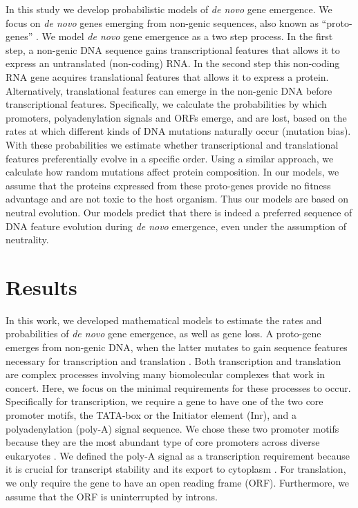 \documentclass[12pt,a4paper]{article}
\begin{document}
In this study we develop probabilistic models of \textit{de novo} gene emergence. We focus on \textit{de novo} genes emerging from non-genic sequences, also known as ``proto-genes'' \citep{protogenes,vanOss}. We model \textit{de novo} gene emergence as a two step process. In the first step, a non-genic DNA sequence gains transcriptional features that allows it to express an untranslated (non-coding) RNA. In the second step this non-coding RNA gene acquires translational features that allows it to express a protein. Alternatively, translational features can emerge in the non-genic DNA before transcriptional features. Specifically, we calculate the probabilities by which promoters, polyadenylation signals and ORFs emerge, and are lost, based on the rates at which different kinds of DNA mutations naturally occur (mutation bias). With these probabilities we estimate whether transcriptional and translational features preferentially evolve in a specific order. Using a similar approach, we calculate how random mutations affect protein composition. In our models, we assume that the proteins expressed from these proto-genes provide no fitness advantage and are not toxic to the host organism. Thus our models are based on neutral evolution. Our models predict that there is indeed a preferred sequence of DNA feature evolution during \textit{de novo} emergence, even under the assumption of neutrality.

\section{Results}

In this work, we developed mathematical models to estimate the rates and probabilities of \textit{de novo} gene emergence, as well as gene loss. A proto-gene emerges from non-genic DNA, when the latter mutates to gain sequence features necessary for transcription and translation \citep{protogenes,vanOss}. Both transcription and translation are complex processes involving many biomolecular complexes that work in concert. Here, we focus on the minimal requirements for these processes to occur. Specifically for transcription, we require a gene to have one of the two core promoter motifs, the TATA-box or the Initiator element (Inr), and a polyadenylation (poly-A) signal sequence. We chose these two promoter motifs because they are the most abundant type of core promoters across diverse eukaryotes \citep{Promoters,corepromoters}. We defined the poly-A signal as a transcription requirement because it is crucial for transcript stability and its export to cytoplasm \citep{polyAterm,polyAexp}. For translation, we only require the gene to have an open reading frame (ORF). Furthermore, we assume that the ORF is uninterrupted by introns. 
\end{document}
